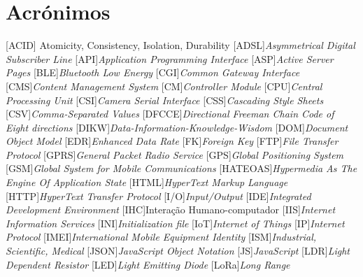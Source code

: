 
\chapter*{Acrónimos}

\begin{multicols}{2}
	
\begin{acronym}[RELAX NG]
	[ACID]{ Atomicity, Consistency, Isolation, Durability}
	[ADSL]{\textit{Asymmetrical Digital Subscriber Line}}
	[API]{\textit{Application Programming Interface}}
	[ASP]{\textit{Active Server Pages}}
	[BLE]{\textit{Bluetooth Low Energy}}
	[CGI]{\textit{Common Gateway Interface}}
	[CMS]{\textit{Content Management System}}
	[CM]{\textit{Controller Module}}
	[CPU]{\textit{Central Processing Unit}}
	[CSI]{\textit{Camera Serial Interface}}
	[CSS]{\textit{Cascading Style Sheets}}
	[CSV]{\textit{Comma-Separated Values}}
	[DFCCE]{\textit{Directional Freeman Chain Code of Eight directions}}
	[DIKW]{\textit{Data-Information-Knowledge-Wisdom}}
	[DOM]{\textit{Document Object Model}}
	[EDR]{\textit{Enhanced Data Rate}}
	[FK]{\textit{Foreign Key}}
	[FTP]{\textit{File Transfer Protocol}}
	[GPRS]{\textit{General Packet Radio Service}}
	[GPS]{\textit{Global Positioning System}}
	[GSM]{\textit{Global System for Mobile Communications}}
	[HATEOAS]{\textit{Hypermedia As The Engine Of Application State}}
	[HTML]{\textit{HyperText Markup Language}}
	[HTTP]{\textit{HyperText Transfer Protocol}}
	[I/O]{\textit{Input/Output}}
	[IDE]{\textit{Integrated Development Environment}}
	[IHC]{Interação Humano-computador}
	[IIS]{\textit{Internet Information Services}}
	[INI]{\textit{Initialization file}}
	[IoT]{\textit{Internet of Things}}
	[IP]{\textit{Internet Protocol}}
	[IMEI]{\textit{International Mobile Equipment Identity}}
	[ISM]{\textit{Industrial, Scientific, Medical}}
	[JSON]{\textit{JavaScript Object Notation}}
	[JS]{\textit{JavaScript}}
	[LDR]{\textit{Light Dependent Resistor}}
	[LED]{\textit{Light Emitting Diode}}
	[LoRa]{\textit{Long Range}}

\end{acronym}
\end{multicols}
